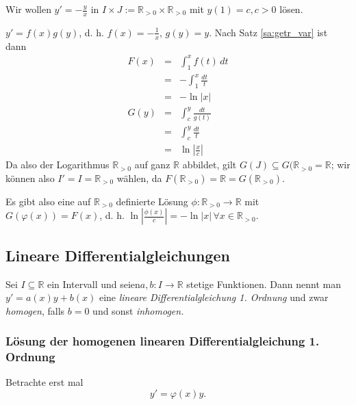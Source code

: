 \documentclass[10pt]{scrbook}
\begin{document}
\begin{Bsp}
Wir wollen $y'=-\frac{y}{x}$ in $I\times J:=\mathbb{R}_{>0}\times \mathbb{R}_{>0}$ mit $y(1)=c, c>0$ lösen.

$y'=f(x) g(y)$, d. h. $f(x)=-\frac{1}{x}$, $g(y)=y$. Nach Satz 
\ref{sa:getr_var} ist dann
\begin{eqnarray*}
F(x) & = & \int_1^x f(t)\,dt \\
& = & -\int_1^x \frac{dt}{t} \\
& = & -\ln \left|x\right| \\
G(y) & = & \int_c^y \frac{dt}{g(t)} \\
& = & \int_c^y \frac{dt}{t} \\
& = & \ln \left|\frac{x}{c}\right|
\end{eqnarray*}
Da also der Logarithmus $\mathbb{R}_{>0}$ auf ganz $\mathbb{R}$ abbildet, gilt $G(J)\subseteq G(\mathbb{R}_{>0}=\mathbb{R}$; wir können also $I'=I=\mathbb{R}_{>0}$ wählen, da $F(\mathbb{R}_{>0})=\mathbb{R}=G(\mathbb{R}_{>0})$.

Es gibt also eine auf $\mathbb{R}_{>0}$ definierte Lösung $\phi: \mathbb{R}_{>0}\rightarrow \mathbb{R}$ mit $G(\varphi(x))=F(x)$, d. h. $\ln \left|\frac{\phi(x)}{c}\right|=-\ln \left|x\right|\,\forall x\in\mathbb{R}_{>0}$.
\end{Bsp}

\subsection{Lineare Differentialgleichungen}

\begin{Def}
Sei $I\subseteq \mathbb{R}$ ein Intervall und seien$a, b: I\rightarrow \mathbb{R}$ stetige Funktionen. Dann nennt man $y'=a(x) y+b(x)$ eine \emph{lineare Differentialgleichung 1. Ordnung} und zwar \emph{homogen}, falls $b = 0$ und sonst \emph{inhomogen.}
\end{Def}

\subsubsection{Lösung der homogenen linearen Differentialgleichung 1. Ordnung}

Betrachte erst mal 
\begin{equation}
y'=\varphi(x) y. \label{eqn:linear}
\end{equation}
\end{document}

